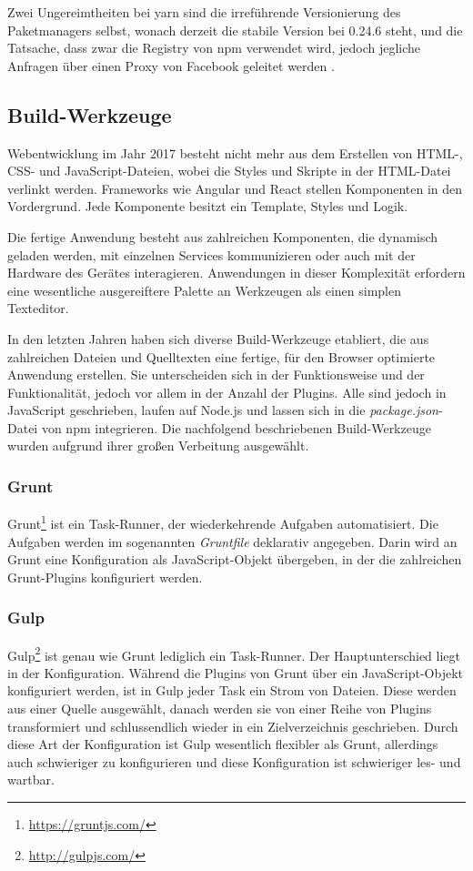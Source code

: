 Zwei Ungereimtheiten bei yarn sind die irreführende Versionierung des Paketmanagers selbst, wonach derzeit die stabile Version bei 0.24.6 steht, und die Tatsache, dass zwar die Registry von npm verwendet wird, jedoch jegliche Anfragen über einen Proxy von Facebook geleitet werden \autocite{Nemeth.yarnpkg:online}.


\subsection{Build-Werkzeuge}
\label{sub:build-tools}
Webentwicklung im Jahr 2017 besteht nicht mehr aus dem Erstellen von HTML-, CSS- und JavaScript-Dateien, wobei die Styles und Skripte in der HTML-Datei verlinkt werden.
Frameworks wie Angular und React stellen Komponenten in den Vordergrund.
Jede Komponente besitzt ein Template, Styles und Logik.

Die fertige Anwendung besteht aus zahlreichen Komponenten, die dynamisch geladen werden, mit einzelnen Services kommunizieren oder auch mit der Hardware des Gerätes interagieren.
Anwendungen in dieser Komplexität erfordern eine wesentliche ausgereiftere Palette an Werkzeugen als einen simplen Texteditor.

In den letzten Jahren haben sich diverse Build-Werkzeuge etabliert, die aus zahlreichen Dateien und Quelltexten eine fertige, für den Browser optimierte Anwendung erstellen.
Sie unterscheiden sich in der Funktionsweise und der Funktionalität, jedoch vor allem in der Anzahl der Plugins.
Alle sind jedoch in JavaScript geschrieben, laufen auf Node.js und lassen sich in die \emph{package.json}-Datei von npm integrieren.
Die nachfolgend beschriebenen Build-Werkzeuge wurden aufgrund ihrer großen Verbeitung ausgewählt.

\subsubsection{Grunt}
\label{sub:grunt}
Grunt\footnote{\url{https://gruntjs.com/}} ist ein Task-Runner, der wiederkehrende Aufgaben automatisiert.
Die Aufgaben werden im sogenannten \emph{Gruntfile} deklarativ angegeben.
Darin wird an Grunt eine Konfiguration als JavaScript-Objekt übergeben, in der die zahlreichen Grunt-Plugins konfiguriert werden.

\subsubsection{Gulp}
\label{sub:gulp}
Gulp\footnote{\url{http://gulpjs.com/}} ist genau wie Grunt lediglich ein Task-Runner.
Der Hauptunterschied liegt in der Konfiguration.
Während die Plugins von Grunt über ein JavaScript-Objekt konfiguriert werden, ist in Gulp jeder Task ein Strom von Dateien.
Diese werden aus einer Quelle ausgewählt, danach werden sie von einer Reihe von Plugins transformiert und schluss\-end\-lich wieder in ein Zielverzeichnis geschrieben.
Durch diese Art der Konfiguration ist Gulp wesentlich flexibler als Grunt, allerdings auch schwieriger zu konfigurieren und diese Konfiguration ist schwieriger les- und wartbar.

